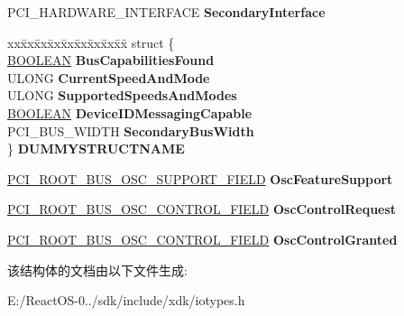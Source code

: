 \begin{DoxyCompactItemize}
\item 
\mbox{\label{struct___p_c_i___r_o_o_t___b_u_s___h_a_r_d_w_a_r_e___c_a_p_a_b_i_l_i_t_y_ae231d8f4afd5915db1d740cdac736d62}} 
P\+C\+I\+\_\+\+H\+A\+R\+D\+W\+A\+R\+E\+\_\+\+I\+N\+T\+E\+R\+F\+A\+CE {\bfseries Secondary\+Interface}
\item 
\mbox{\label{struct___p_c_i___r_o_o_t___b_u_s___h_a_r_d_w_a_r_e___c_a_p_a_b_i_l_i_t_y_a7b4c1a191f674e9db672b5c71ff01c45}} 
\begin{tabbing}
xx\=xx\=xx\=xx\=xx\=xx\=xx\=xx\=xx\=\kill
struct \{\\
\>\hyperlink{_processor_bind_8h_a112e3146cb38b6ee95e64d85842e380a}{BOOLEAN} {\bfseries BusCapabilitiesFound}\\
\>ULONG {\bfseries CurrentSpeedAndMode}\\
\>ULONG {\bfseries SupportedSpeedsAndModes}\\
\>\hyperlink{_processor_bind_8h_a112e3146cb38b6ee95e64d85842e380a}{BOOLEAN} {\bfseries DeviceIDMessagingCapable}\\
\>PCI\_BUS\_WIDTH {\bfseries SecondaryBusWidth}\\
\} {\bfseries DUMMYSTRUCTNAME}\\

\end{tabbing}\item 
\mbox{\label{struct___p_c_i___r_o_o_t___b_u_s___h_a_r_d_w_a_r_e___c_a_p_a_b_i_l_i_t_y_aa102afd2de39828976309eef77022476}} 
\hyperlink{struct___p_c_i___r_o_o_t___b_u_s___o_s_c___s_u_p_p_o_r_t___f_i_e_l_d}{P\+C\+I\+\_\+\+R\+O\+O\+T\+\_\+\+B\+U\+S\+\_\+\+O\+S\+C\+\_\+\+S\+U\+P\+P\+O\+R\+T\+\_\+\+F\+I\+E\+LD} {\bfseries Osc\+Feature\+Support}
\item 
\mbox{\label{struct___p_c_i___r_o_o_t___b_u_s___h_a_r_d_w_a_r_e___c_a_p_a_b_i_l_i_t_y_ab80dd787401475bd3b5f839448885524}} 
\hyperlink{struct___p_c_i___r_o_o_t___b_u_s___o_s_c___c_o_n_t_r_o_l___f_i_e_l_d}{P\+C\+I\+\_\+\+R\+O\+O\+T\+\_\+\+B\+U\+S\+\_\+\+O\+S\+C\+\_\+\+C\+O\+N\+T\+R\+O\+L\+\_\+\+F\+I\+E\+LD} {\bfseries Osc\+Control\+Request}
\item 
\mbox{\label{struct___p_c_i___r_o_o_t___b_u_s___h_a_r_d_w_a_r_e___c_a_p_a_b_i_l_i_t_y_af67fe7cc2ddc7cd663540ce3c3ce22ae}} 
\hyperlink{struct___p_c_i___r_o_o_t___b_u_s___o_s_c___c_o_n_t_r_o_l___f_i_e_l_d}{P\+C\+I\+\_\+\+R\+O\+O\+T\+\_\+\+B\+U\+S\+\_\+\+O\+S\+C\+\_\+\+C\+O\+N\+T\+R\+O\+L\+\_\+\+F\+I\+E\+LD} {\bfseries Osc\+Control\+Granted}
\end{DoxyCompactItemize}


该结构体的文档由以下文件生成\+:\begin{DoxyCompactItemize}
\item 
E\+:/\+React\+O\+S-\/0../sdk/include/xdk/iotypes.\+h\end{DoxyCompactItemize}
